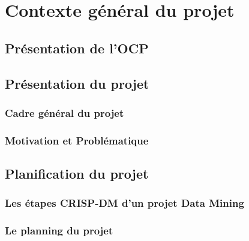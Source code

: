 \chapter{Contexte général du projet}


\cleardoublepage

\section{Présentation de l’OCP}

	
\section{Présentation du projet}
	\subsection{Cadre général du projet}
	
	\subsection{Motivation et Problématique}


\section{Planification du projet}
	\subsection{Les étapes CRISP-DM d'un projet Data Mining}
	\subsection{Le planning du projet}